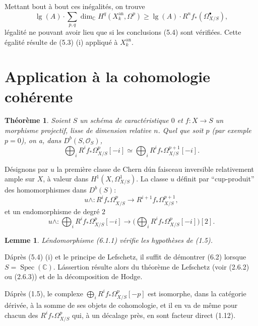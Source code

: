 \documentclass[12pt]{amsart}
\theoremstyle{plain}
\newtheorem{thm}[prop]{Th\'eor\`eme}
\newtheorem{lem}[prop]{Lemme}
\theoremstyle{remark}
\DeclareMathOperator{\Spec}{Spec}
\DeclareMathOperator{\lgB}{lg}
\newcommand{\cO}{\mathscr{O}}
\newcommand{\db}{D^b}
\begin{document}
Mettant bout \`a bout ces in\'egalit\'es, on trouve
\begin{equation}\label{eq:5.5.7}
\lgB(A) \cdot \sum_{p,q} \dim_\mathbb{C} H^q(X_k^{\text{an}}, \Omega^p) \geq \lgB(A) \cdot R^n f_* (\Omega_{X/S}^\bullet),
\end{equation}
l\'egalit\'e ne pouvant avoir lieu que si les conclusions (5.4) sont v\'erifi\'ees. Cette \'egalit\'e r\'esulte de (5.3) (i) appliqu\'e \`a $X_k^{\text{an}}$.

\section{Application \`a la cohomologie coh\'erente}

\begin{thm}\label{thm:6.1}
Soient $S$ un sch\'ema de caract\'eristique $0$ et $f : X \to S$ un morphisme projectif, lisse de dimension relative $n$. Quel que soit $p$ (par exemple $p = 0$), on a, dans $\db(S, \cO_S)$,
\[
\bigoplus_i R^i f_* \Omega_{X/S}^p[-i] \simeq \bigoplus_i R^i f_* \Omega_{X/S}^{p+1}[-i].
\]
\end{thm}

D\'esignons par $u$ la premi\`ere classe de Chern d\'un faisceau inversible relativement ample sur $X$, \`a valeur dans $H^1(X, \Omega_{X/S}^1)$. La classe $u$ d\'efinit par ``cup-produit'' des homomorphismes dans $\db(S)$:
\[
u \wedge : R^i f_* \Omega_{X/S}^p \longrightarrow R^{i+1} f_* \Omega_{X/S}^{p+1},
\]
et un endomorphisme de degr\'e $2$
\begin{equation}\label{eq:6.1.1}
u \wedge : \bigoplus_i R^i f_* \Omega_{X/S}^p[-i] \longrightarrow \bigl(\bigoplus_i R^i f_* \Omega_{X/S}^p[-i]\bigr)[2].
\end{equation}

\begin{lem}\label{lem:6.2}
L\'endomorphisme (6.1.1) v\'erifie les hypoth\`eses de (1.5).
\end{lem}

D\'apr\`es (5.4) (i) et le principe de Lefschetz, il suffit de d\'emontrer (6.2) lorsque $S = \Spec(\mathbb{C})$. L\'assertion r\'esulte alors du th\'eor\`eme de Lefschetz (voir (2.6.2) ou (2.6.3)) et de la d\'ecomposition de Hodge.

D\'apr\`es (1.5), le complexe $\bigoplus_i R^i f_* \Omega_{X/S}^p[-p]$ est isomorphe, dans la cat\'egorie d\'eriv\'ee, \`a la somme de ses objets de cohomologie, et il en va de m\^eme pour chacun des $R^i f_* \Omega_{X/S}^p$ qui, \`a un d\'ecalage pr\`es, en sont facteur direct (1.12).
\end{document}
